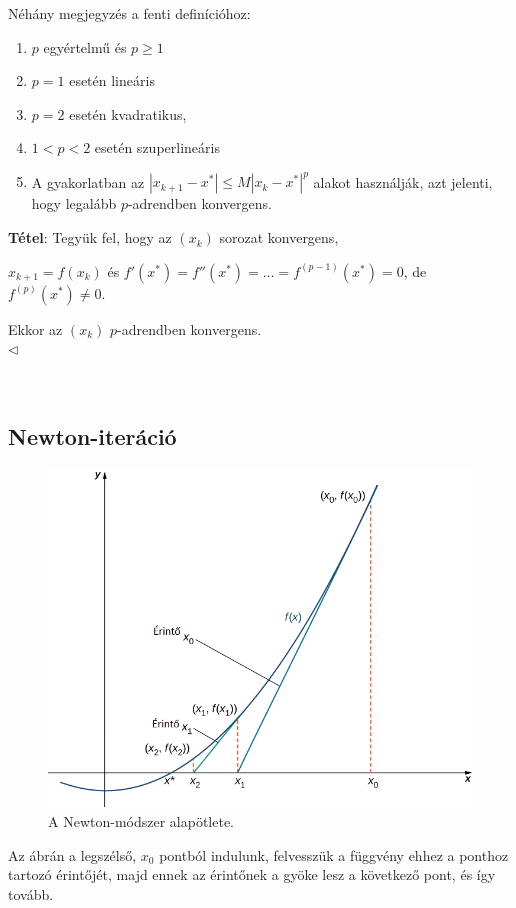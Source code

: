 \documentclass[tikz,12pt,margin=0px]{article}
\begin{document}
{	\noindent Néhány megjegyzés a fenti definícióhoz:
	
	\begin{enumerate}
		\item	$p$ egyértelmű és $p \geq 1$
		\item	$p=1$ esetén lineáris
        \item $p=2$ esetén kvadratikus,
        \item $1 < p < 2$ esetén szuperlineáris
		\item	A gyakorlatban az $|x_{k+1} - x^{*}| \leq M|x_{k} - x^{*}|^{p}$ alakot használják, azt jelenti, hogy
		legalább $p$-adrendben konvergens.
	\end{enumerate}
	
	\noindent \textbf{Tétel}: Tegyük fel, hogy az $(x_{k})$ sorozat konvergens,
\begin{center}
	$x_{k+1} = f(x_{k})$ és $f'(x^{*}) = f''(x^{*}) = \ldots = f^{(p-1)}(x^{*}) = 0$, de $f^{(p)}(x^{*}) \not = 0$.\\
\end{center}
	Ekkor az $(x_{k})$ $p$-adrendben konvergens.\\
    $\triangleleft$ \faLightbulbO}\\	

	\subsection*{Newton-iteráció}

	\begin{figure}[H]
		\centering
		\includegraphics[width=0.5\linewidth]{img/newton_pelda.png}
		\caption{A Newton-módszer alapötlete.}
		\label{fig:newton_pelda}
	\end{figure}

	\noindent Az ábrán a legszélső, $x_{0}$ pontból indulunk, felvesszük a függvény ehhez a ponthoz tartozó
	érintőjét, majd ennek az érintőnek a gyöke lesz a következő pont, és így tovább.\\
\end{document}
